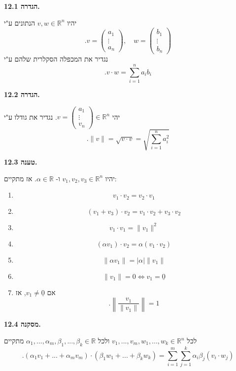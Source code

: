 \documentclass[12pt]{report}
\theoremstyle{plain}
\theoremstyle{definition}
\newcommand{\R}{\mathbb{R}}
\newcommand{\0}{\mathbf{0}}
\begin{document}
\noindent\textbf{הגדרה 12.1.}

יהיו 
$v,w\in\R^n$
הנתונים ע"י
$$
.v=\begin{pmatrix}
a_1 \\
\vdots \\
a_n
\end{pmatrix},\quad w=\begin{pmatrix}
b_1 \\
\vdots \\
b_n
\end{pmatrix}
$$
נגדיר את המכפלה הסקלרית שלהם ע"י
$$
.v\cdot w=\sum_{i=1}^n a_ib_i
$$
\bigskip
\bigskip

\noindent\textbf{הגדרה 12.2.}

יהי
$v=\begin{pmatrix}
    a_1 \\
    \vdots \\
    v_n
    \end{pmatrix}\in\R^n$.
נגדיר את גודלו ע"י 
$$
.\|v\|=\sqrt{v\cdot v}=\sqrt{\sum_{i=1}^n a_i^2}
$$
\bigskip
\bigskip

\noindent\textbf{טענה 12.3.}

יהיו
$v_1,v_2,v_3\in\R^n$
ו-
$\alpha\in\R$.
אז מתקיים:

\begin{enumerate}[label=\alph*.]
\item 
$$
v_1\cdot v_2=v_2\cdot v_1
$$


\item 
$$
(v_1+v_3)\cdot v_2=v_1\cdot v_2+v_3\cdot v_2
$$


\item 
$$
v_1\cdot v_1=\|v_1\|^2
$$


\item 
$$
(\alpha v_1)\cdot v_2=\alpha(v_1\cdot v_2)
$$


\item 
$$
\|\alpha v_1\|=|\alpha|\|v_1\|
$$


\item 
$$
\|v_1\|=0\iff v_1=\underline{0}
$$


\item
אם 
$v_1\neq\underline{0}$,
אז
$$
.\left\|\frac{v_1}{\|v_1\|}\right\|=1
$$


\end{enumerate}
\bigskip
\bigskip

\noindent\textbf{מסקנה 12.4.}

לכל
$v_1,...,v_m,w_1,...,w_k\in\R^n$
ולכל
$\alpha_1,...,\alpha_m,\beta_1,...,\beta_k\in\R$
מתקיים
$$
.(\alpha_1v_1+...+\alpha_mv_m)\cdot(\beta_1w_1+...+\beta_kw_k)=\sum_{i=1}^m\sum_{j=1}^k\alpha_i\beta_j(v_i\cdot w_j)
$$
\bigskip
\bigskip
\end{document}
